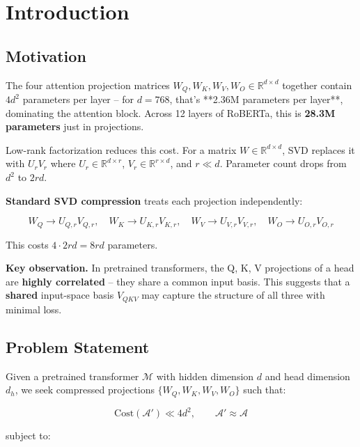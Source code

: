 \section{Introduction}

\subsection{Motivation}

The four attention projection matrices $W_Q, W_K, W_V, W_O \in \mathbb{R}^{d \times d}$ 
together contain $4 d^2$ parameters per layer -- for $d = 768$, that's **2.36M 
parameters per layer**, dominating the attention block. Across 12 layers of 
RoBERTa, this is \textbf{28.3M parameters} just in projections.

Low-rank factorization reduces this cost. For a matrix $W \in \mathbb{R}^{d \times d}$, 
SVD replaces it with $U_r V_r$ where $U_r \in \mathbb{R}^{d \times r}$, 
$V_r \in \mathbb{R}^{r \times d}$, and $r \ll d$. Parameter count drops from 
$d^2$ to $2 r d$.

\textbf{Standard SVD compression} treats each projection independently:

\begin{equation}
W_Q \to U_{Q,r} V_{Q,r}, \quad W_K \to U_{K,r} V_{K,r}, \quad W_V \to U_{V,r} V_{V,r}, \quad W_O \to U_{O,r} V_{O,r}
\end{equation}

This costs $4 \cdot 2 r d = 8 r d$ parameters.

\textbf{Key observation.} In pretrained transformers, the Q, K, V projections of a 
head are \textbf{highly correlated} -- they share a common input basis. This suggests 
that a \textbf{shared} input-space basis $V_{QKV}$ may capture the structure of all 
three with minimal loss.

\subsection{Problem Statement}

Given a pretrained transformer $\mathcal{M}$ with hidden dimension $d$ and 
head dimension $d_h$, we seek compressed projections 
$\{W_Q, W_K, W_V, W_O\}$ such that:

\begin{equation}
\text{Cost}(\mathcal{A}') \ll 4 d^2, \qquad
\mathcal{A}' \approx \mathcal{A}
\end{equation}

subject to:

